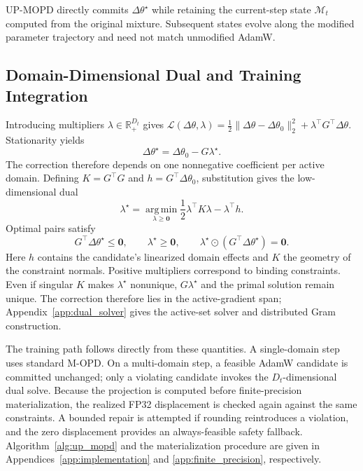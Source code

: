 \documentclass{article}
\begin{document}
UP-MOPD directly commits $\Delta\theta^\star$ while retaining the current-step
state $\mathcal M_t$ computed from the original mixture. Subsequent states
evolve along the modified parameter trajectory and need not match unmodified
AdamW.

\subsection{Domain-Dimensional Dual and Training Integration}

Introducing multipliers $\lambda\in\mathbb R_+^{D_t}$ gives
$\mathcal L(\Delta\theta,\lambda)=
\tfrac12\|\Delta\theta-\Delta\theta_0\|_2^2+
\lambda^\top G^\top\Delta\theta$. Stationarity yields
\begin{equation}
\Delta\theta^\star=\Delta\theta_0-G\lambda^\star.
\label{eq:up_correction}
\end{equation}
The correction therefore depends on one nonnegative coefficient per active
domain. Defining $K=G^\top G$ and $h=G^\top\Delta\theta_0$, substitution gives
the low-dimensional dual
\begin{equation}
\lambda^\star
=\operatorname*{arg\,min}_{\lambda\ge\mathbf0}
\frac12\lambda^\top K\lambda-\lambda^\top h.
\label{eq:up_dual}
\end{equation}
Optimal pairs satisfy
\begin{equation}
G^\top\Delta\theta^\star\le\mathbf0,\qquad
\lambda^\star\ge\mathbf0,\qquad
\lambda^\star\odot(G^\top\Delta\theta^\star)=\mathbf0.
\label{eq:up_kkt}
\end{equation}
Here $h$ contains the candidate's linearized domain effects and $K$ the
geometry of the constraint normals. Positive multipliers correspond to binding
constraints. Even if singular $K$ makes $\lambda^\star$ nonunique,
$G\lambda^\star$ and the primal solution remain unique. The correction therefore
lies in the active-gradient span; Appendix~\ref{app:dual_solver} gives the
active-set solver and distributed Gram construction.

The training path follows directly from these quantities. A single-domain step
uses standard M-OPD. On a multi-domain step, a feasible AdamW candidate is
committed unchanged; only a violating candidate invokes the $D_t$-dimensional
dual solve. Because the projection is computed before finite-precision
materialization, the realized FP32 displacement is checked again against the
same constraints. A bounded repair is attempted if rounding reintroduces a
violation, and the zero displacement provides an always-feasible safety
fallback. Algorithm~\ref{alg:up_mopd} and the materialization procedure are
given in Appendices~\ref{app:implementation} and
\ref{app:finite_precision}, respectively.
\end{document}
